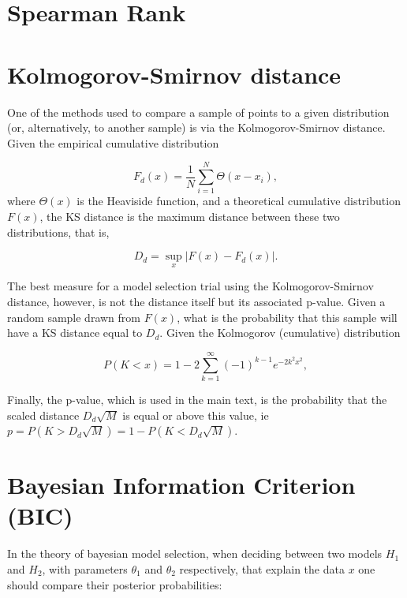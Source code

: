 \section{Spearman Rank}

\section{Kolmogorov-Smirnov distance}

One of the methods used to compare a sample of points to a given
distribution (or, alternatively, to another sample) is via the
Kolmogorov-Smirnov distance. Given the empirical cumulative distribution 

\begin{equation}
F_d (x) = \frac{1}{N} \sum_{i=1}^N \Theta(x - x_i),
\end{equation}
where $\Theta(x)$ is the Heaviside function, and a theoretical
cumulative distribution $F(x)$, the KS distance is the maximum
distance between these two distributions, that is,

\begin{equation}
  \label{eq:9}
  D_d = \sup_x |F(x) - F_d(x)|.
\end{equation}

The best measure for a model selection trial using the
Kolmogorov-Smirnov distance, however, is not the distance itself but
its associated p-value. Given a random sample drawn from $F(x)$, what
is the probability that this sample will have a KS distance equal to
$D_d$. Given the Kolmogorov (cumulative) distribution

\begin{equation}
  \label{eq:1}
  P(K < x) = 1 - 2 \sum_{k=1}^\infty (-1)^{k-1}e^{-2k^2 x^2},
\end{equation}

Finally, the p-value, which is used in the main text, is the probability that the scaled distance
$D_d \sqrt{M}$ is equal or above this value, ie
$p = P(K > D_d\sqrt{M}) = 1 - P(K< D_d \sqrt{M})$.

\section{Bayesian Information Criterion (BIC)}

In the theory of bayesian model selection, when deciding between two
models $H_1$ and $H_2$, with parameters $\theta_1$ and $\theta_2$
respectively, that explain the data $x$ one should compare their
posterior probabilities:


